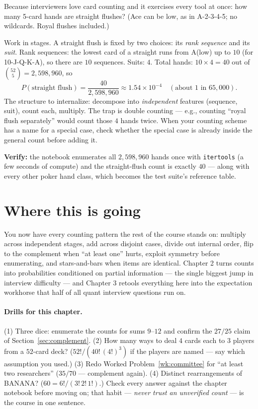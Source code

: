 \begin{worked}\label{wk:poker}
Because interviewers love card counting and it exercises every tool at once: how many 5-card hands are straight flushes? (Ace can be low, as in A-2-3-4-5; no wildcards. Royal flushes included.)

Work in stages. A straight flush is fixed by two choices: its \emph{rank sequence} and its \emph{suit}. Rank sequences: the lowest card of a straight runs from A(low) up to $10$ (for 10-J-Q-K-A), so there are $10$ sequences. Suits: $4$. Total hands: $10 \times 4 = 40$ out of $\binom{52}{5} = 2{,}598{,}960$, so
\[
P(\text{straight flush}) = \frac{40}{2{,}598{,}960} \approx 1.54 \times 10^{-4} \quad (\text{about } 1 \text{ in } 65{,}000).
\]
The structure to internalize: decompose into \emph{independent} features (sequence, suit), count each, multiply. The trap is double counting --- e.g., counting ``royal flush separately'' would count those $4$ hands twice. When your counting scheme has a name for a special case, check whether the special case is already inside the general count before adding it.

\textbf{Verify:} the notebook enumerates all $2{,}598{,}960$ hands once with \texttt{itertools} (a few seconds of compute) and the straight-flush count is exactly $40$ --- along with every other poker hand class, which becomes the test suite's reference table.
\end{worked}

\section{Where this is going}

You now have every counting pattern the rest of the course stands on: multiply across independent stages, add across disjoint cases, divide out internal order, flip to the complement when ``at least one'' hurts, exploit symmetry before enumerating, and stars-and-bars when items are identical. Chapter 2 turns counts into probabilities conditioned on partial information --- the single biggest jump in interview difficulty --- and Chapter 3 retools everything here into the expectation workhorse that half of all quant interview questions run on.

\paragraph{Drills for this chapter.} (1) Three dice: enumerate the counts for sums $9$--$12$ and confirm the $27/25$ claim of Section~\ref{sec:complement}. (2) How many ways to deal $4$ cards each to $3$ players from a $52$-card deck? ($52!/(40!\,(4!)^3)$ if the players are named --- say which assumption you used.) (3) Redo Worked Problem~\ref{wk:committee} for ``at least two researchers'' ($35/70$ --- complement again). (4) Distinct rearrangements of \textsc{BANANA}? ($60 = 6!/(3!\,2!\,1!)$.) Check every answer against the chapter notebook before moving on; that habit --- \emph{never trust an unverified count} --- is the course in one sentence.